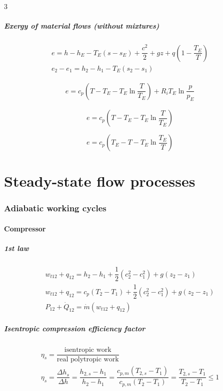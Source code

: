 \documentclass[9pt, landscape, a4paper]{article}
\begin{document}
\begin{multicols*}{3}
\subsubsection{Exergy of material flows (without mixtures)}
\begin{gather*}
  e = h - h_E - T_E\left(s-s_E\right) + \dfrac{c^2}{2} + gz + q\left(1-\dfrac{T_E}{T}\right)\\[1ex]
  \boxed{e_2 - e_1 = h_2 - h_1 - T_E\left(s_2 - s_1\right)}
\end{gather*}

\begin{gather*}
  e = c_p\left(T - T_E - T_E \ln\dfrac{T}{T_E}\right) + R_i T_E \ln\dfrac{p}{p_E}
\end{gather*}

\[e = c_p\left(T - T_E - T_E\ln\dfrac{T}{T_E}\right)\]

\[e = c_p\left(T_E - T - T_E\ln\dfrac{T_E}{T}\right)\]
\vfill \phantom{}

\newcolumn
\vspace*{-.7cm}
\part{Steady-state flow processes}
\section{Adiabatic working cycles}
\subsection{Compressor}
\subsubsection{1st law}
\begin{gather*}
  w_{t12} + q_{12} = h_2 - h_1 + \dfrac{1}{2}\left(c_2^2 - c_1^2\right) + g\left(z_2 - z_1\right)\\
  w_{t12} + q_{12} = c_p\left(T_2 - T_1\right) + \dfrac{1}{2}\left(c_2^2 - c_1^2\right) + g\left(z_2 - z_1\right)\\
  P_{12} + \dot{Q}_{12} = \dot{m}\left(w_{t12} + q_{12}\right)
\end{gather*}

\subsubsection{Isentropic compression efficiency factor}
\begin{gather*}
  \eta_s = \dfrac{\text{isentropic work}}{\text{real polytropic work}}\\[1.5ex]
  \eta_s = \dfrac{\Delta h_s}{\Delta h} = \dfrac{h_{2,s} - h_1}{h_2 - h_1} = \dfrac{c_{p,m} \left(T_{2,s} - T_1\right)}{c_{p,m} \left(T_2 - T_1\right)} = \dfrac{T_{2,s} - T_1}{T_2 - T_1} \leq 1
\end{gather*}


\end{multicols*}
\end{document}
